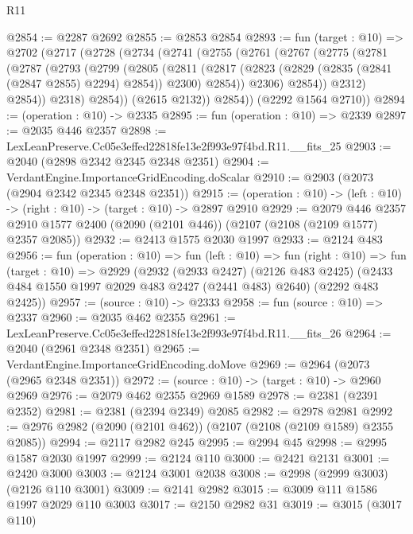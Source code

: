 \begin{lexlean}{R11}
\begin{coremodule}
@2854 := @2287 @2692
@2855 := @2853 @2854
@2893 := fun (target : @10) =>
  @2702
    (@2717
      (@2728
        (@2734
          (@2741
            (@2755
              (@2761
                (@2767
                  (@2775
                    (@2781
                      (@2787
                        (@2793
                          (@2799
                            (@2805
                              (@2811
                                (@2817
                                  (@2823 (@2829 (@2835 (@2841 (@2847 @2855) @2294) @2854)) @2300)
                                  @2854))
                              @2306)
                            @2854))
                        @2312)
                      @2854))
                  @2318)
                @2854))
            (@2615 @2132))
          @2854))
      (@2292 @1564 @2710))
@2894 := (operation : @10) -> @2335
@2895 := fun (operation : @10) => @2339
@2897 := @2035 @446 @2357
@2898 := LexLeanPreserve.Cc05e3effed22818fe13e2f993e97f4bd.R11.__fits_25
@2903 := @2040 (@2898 @2342 @2345 @2348 @2351)
@2904 := VerdantEngine.ImportanceGridEncoding.doScalar
@2910 := @2903 (@2073 (@2904 @2342 @2345 @2348 @2351))
@2915 := (operation : @10) -> (left : @10) -> (right : @10) -> (target : @10) -> @2897 @2910
@2929 := @2079
    @446
    @2357
    @2910
    @1577
    @2400
    (@2090 (@2101 @446))
    (@2107 (@2108 (@2109 @1577) @2357 @2085))
@2932 := @2413 @1575 @2030 @1997
@2933 := @2124 @483
@2956 := fun (operation : @10) =>
  fun (left : @10) =>
  fun (right : @10) =>
  fun (target : @10) =>
  @2929
    (@2932
      (@2933 @2427)
      (@2126 @483 @2425)
      (@2433 @484 @1550 @1997 @2029 @483 @2427 (@2441 @483) @2640)
      (@2292 @483 @2425))
@2957 := (source : @10) -> @2333
@2958 := fun (source : @10) => @2337
@2960 := @2035 @462 @2355
@2961 := LexLeanPreserve.Cc05e3effed22818fe13e2f993e97f4bd.R11.__fits_26
@2964 := @2040 (@2961 @2348 @2351)
@2965 := VerdantEngine.ImportanceGridEncoding.doMove
@2969 := @2964 (@2073 (@2965 @2348 @2351))
@2972 := (source : @10) -> (target : @10) -> @2960 @2969
@2976 := @2079 @462 @2355 @2969 @1589
@2978 := @2381 (@2391 @2352)
@2981 := @2381 (@2394 @2349) @2085
@2982 := @2978 @2981
@2992 := @2976 @2982 (@2090 (@2101 @462)) (@2107 (@2108 (@2109 @1589) @2355 @2085))
@2994 := @2117 @2982 @245
@2995 := @2994 @45
@2998 := @2995 @1587 @2030 @1997
@2999 := @2124 @110
@3000 := @2421 @2131
@3001 := @2420 @3000
@3003 := @2124 @3001 @2038
@3008 := @2998 (@2999 @3003) (@2126 @110 @3001)
@3009 := @2141 @2982
@3015 := @3009 @111 @1586 @1997 @2029 @110 @3003
@3017 := @2150 @2982 @31
@3019 := @3015 (@3017 @110)

\end{coremodule}
\end{lexlean}
